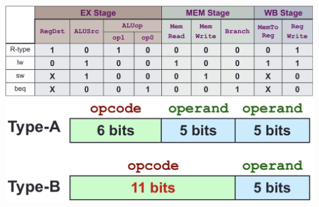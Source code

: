 \documentclass[a4paper]{article} \usepackage[backend=biber, style=numeric, sorting=none]{biblatex}
\begin{document}
\begin{multicols*}{4}
\\ {\centering \includegraphics[angle=90,origin=c,scale=0.25]{InstructionControl}}
\\ {\centering \includegraphics[scale=0.25]{expandingOpcode}}

    \end{multicols*}
\end{document}
